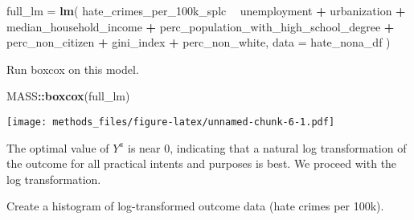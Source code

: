 \documentclass[
]{article}
\newenvironment{Shaded}{\begin{snugshade}}{\end{snugshade}}
\newcommand{\DataTypeTok}[1]{\textcolor[rgb]{0.13,0.29,0.53}{#1}}
\newcommand{\DecValTok}[1]{\textcolor[rgb]{0.00,0.00,0.81}{#1}}
\newcommand{\FloatTok}[1]{\textcolor[rgb]{0.00,0.00,0.81}{#1}}
\newcommand{\KeywordTok}[1]{\textcolor[rgb]{0.13,0.29,0.53}{\textbf{#1}}}
\newcommand{\NormalTok}[1]{#1}
\newcommand{\OperatorTok}[1]{\textcolor[rgb]{0.81,0.36,0.00}{\textbf{#1}}}
\newcommand{\StringTok}[1]{\textcolor[rgb]{0.31,0.60,0.02}{#1}}
\begin{document}
\begin{Shaded}
\begin{Highlighting}[]
\NormalTok{full_lm =}\StringTok{ }\KeywordTok{lm}\NormalTok{(}
\NormalTok{  hate_crimes_per_100k_splc}
  \OperatorTok{~}\StringTok{ }\NormalTok{unemployment }\OperatorTok{+}\StringTok{ }
\StringTok{    }\NormalTok{urbanization }\OperatorTok{+}
\StringTok{    }\NormalTok{median_household_income }\OperatorTok{+}
\StringTok{    }\NormalTok{perc_population_with_high_school_degree }\OperatorTok{+}
\StringTok{    }\NormalTok{perc_non_citizen }\OperatorTok{+}
\StringTok{    }\NormalTok{gini_index }\OperatorTok{+}
\StringTok{    }\NormalTok{perc_non_white,}
  \DataTypeTok{data =}\NormalTok{ hate_nona_df}
\NormalTok{)}
\end{Highlighting}
\end{Shaded}

Run boxcox on this model.

\begin{Shaded}
\begin{Highlighting}[]
\NormalTok{MASS}\OperatorTok{::}\KeywordTok{boxcox}\NormalTok{(full_lm)}
\end{Highlighting}
\end{Shaded}

\texttt{[image: methods\_files/figure-latex/unnamed-chunk-6-1.pdf]}

The optimal value of \(Y^a\) is near 0, indicating that a natural log
transformation of the outcome for all practical intents and purposes is
best. We proceed with the log transformation.

Create a histogram of log-transformed outcome data (hate crimes per
100k).

\begin{Shaded}
\end{Shaded}
\end{document}
